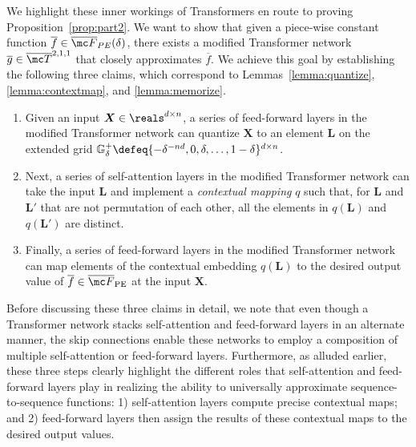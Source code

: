 \documentclass{article} %
\def\mL{{\bm{L}}}
\def\mX{{\bm{X}}}
\def\sG{{\mathbb{G}}}
\begin{document}

We highlight these inner workings of Transformers en route to proving Proposition~\ref{prop:part2}. We want to show that given a piece-wise constant function $\overline f \in \overline{\mc F}_{PE}(\delta)$, there exists a modified Transformer network $\overline{g} \in \overline{\mc T}^{2, 1, 1}$ that closely approximates $\overline{f}$. We achieve this goal by establishing the following three claims, which correspond to Lemmas~\ref{lemma:quantize}, \ref{lemma:contextmap}, and \ref{lemma:memorize}.
\begin{enumerate}[\hspace{5pt}1.]
\setlength{\itemsep}{2pt}
\item Given an input $\mX \in \reals^{d \times n}$, a series of feed-forward layers in the modified Transformer network can quantize $\mX$ to an element $\mL$ on the extended grid $\sG^+_{\delta} \defeq \{ -\delta^{-nd}, 0, \delta, \dots, 1-\delta \}^{d \times n}$.
\item Next, a series of self-attention layers in the modified Transformer network can take the input $\mL$ and implement a {\em contextual mapping} $q$ such that, for $\mL$ and $\mL'$ that are not permutation of each other, all the elements in $q(\mL)$ and $q(\mL')$ are distinct.
\item Finally, a series of feed-forward layers in the modified Transformer network can map elements of the contextual embedding $q(\mL)$ to the desired output value of $\overline{f} \in \overline{\mc F}_{\rm PE}$ at the input $\mX$.
\end{enumerate}

Before discussing these three claims in detail, we note that even though a Transformer network stacks self-attention and feed-forward layers in an alternate manner, the skip connections enable these networks to employ a composition of multiple self-attention or feed-forward layers. Furthermore, as alluded earlier, these three steps clearly highlight the different roles that self-attention and feed-forward layers play in realizing the ability to universally approximate sequence-to-sequence functions: 1) self-attention layers compute precise contextual maps; and 2) feed-forward layers then assign the results of these contextual maps to the desired output values. %
\end{document}
